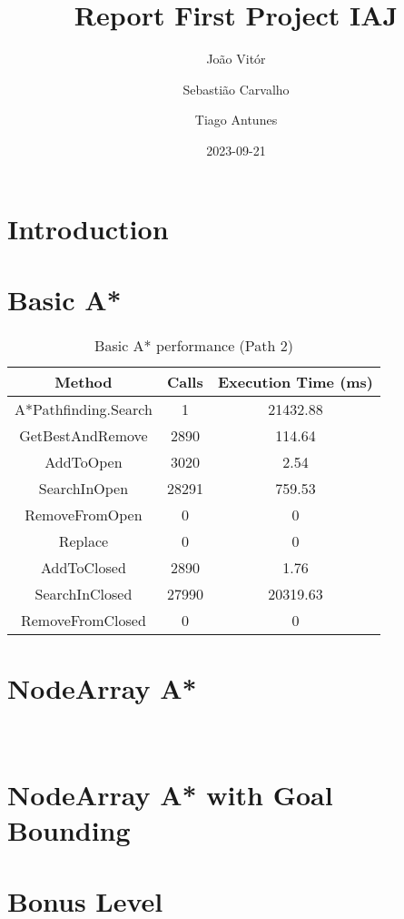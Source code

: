 \documentclass{article}
\title{Report First Project IAJ}
\author{João Vitór
  \and Sebastião Carvalho
  \and Tiago Antunes}
\date{2023-09-21}
\begin{document}
  \maketitle
  \tableofcontents
  \newpage
  \section{Introduction}
  \newpage
  \section{Basic A*}

  \begin{table}[h!]
    \begin{center}
      \caption{Basic A* performance (Path 2)}
      \label{tab:table1}
      \begin{tabular}{c|c|c}
        \textbf{Method} & \textbf{Calls} & \textbf{Execution Time (ms)}\\
        \hline
        A*Pathfinding.Search  & 1 & 21432.88\\
        GetBestAndRemove & 2890 & 114.64\\
        AddToOpen & 3020 & 2.54\\
        SearchInOpen & 28291 & 759.53\\
        RemoveFromOpen & 0 & 0\\
        Replace & 0 & 0\\
        AddToClosed & 2890  & 1.76\\
        SearchInClosed & 27990 & 20319.63\\
        RemoveFromClosed & 0 & 0\\
      \end{tabular}
    \end{center}
  \end{table}

  \newpage
  \section{NodeArray A*}\
  \newpage
  \section{NodeArray A* with Goal Bounding}
  \newpage
  \section{Bonus Level}
\end{document}
